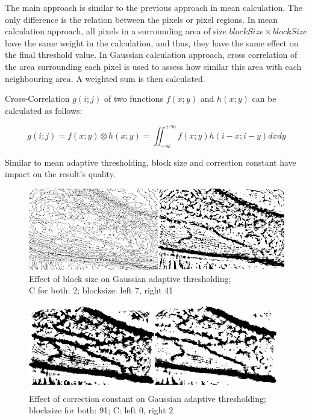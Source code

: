 The main approach is similar to the previous approach in mean calculation. The only difference is the relation between the pixels or pixel regions. In mean calculation approach, all pixels in a surrounding area of size $blockSize \times blockSize$ have the same weight in the calculation, and thus, they have the same effect on the final threshold value. In Gaussian calculation approach, cross correlation of the area surrounding each pixel is used to assess how similar this area with each neighbouring area. A weighted sum is then calculated.

Cross-Correlation $g(i ;j)$ of two functions $f(x ;y)$ and $ h(x; y)$ can be calculated as follows:

\begin{equation}
g(i;j) = f(x; y) \otimes h(x; y) = \iint_{-\infty}^{+\infty} f(x; y) h(i - x; i - y) dx dy
\end{equation}
 
Similar to mean adaptive thresholding, block size and correction constant have impact on the result’s quality.  

\begin{figure}[H]
\centering
\includegraphics[scale=0.8]{figures/compare3.JPG}
\captionsetup{justification=centering}
\caption[Effect of block size on Gaussian adaptive thresholding]{Effect of block size on Gaussian adaptive thresholding;\\C for both: 2; blocksize: left 7, right 41}\label{fig:compare3}
\end{figure}


\begin{figure}[H]
\centering
\includegraphics[scale=0.8]{figures/compare4.JPG}
\captionsetup{justification=centering}

\caption[Effect of correction constant on Gaussian adaptive thresholding]{Effect of correction constant on Gaussian adaptive thresholding;\\ blocksize for both: 91; C: left 0, right 2}\label{fig:compare4}
\end{figure}

